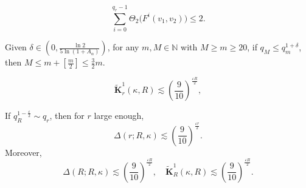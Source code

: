\documentclass[10pt,a4paper]{amsart}
\begin{document}
\begin{equation}\label{r222}
\sum_{i=0}^{q_r-1}\Theta_2\bigl(F^i(v_1,v_2)\bigr)\leq 2.
\end{equation}

\begin{Proposition}\label{arthh}
Given $\delta\in (0,\frac{\ln 2}{5\ln(1+A_\alpha)})$, for any $m,M\in \mathbb{N}$ with $M\geq m\geq 20$, if $q_M\leq q_m^{1+\delta}$, then $M\leq m+[\frac{m}{2}]\leq \frac{3}{2}m$.
\end{Proposition}

\begin{equation}\label{KES}
\widetilde{\mathbf{K}}_r^1(\kappa,R)\lesssim (\frac{9}{10})^{\frac{\varepsilon R}{2}},
\end{equation}

\begin{Lemma}\label{karrr1} If $q_R^{1-\frac{\varepsilon}{2}}\sim q_r$, then for $r$ large enough,
\begin{equation}\label{karrr}
\Delta(r;R,\kappa)\lesssim (\frac{9}{10})^{\frac{\varepsilon r}{2}}.
\end{equation}
Moreover,
\[\Delta(R;R,\kappa)\lesssim (\frac{9}{10})^{\frac{\varepsilon R}{2}},\quad \widetilde{\mathbf{K}}_R^1(\kappa,R)\lesssim (\frac{9}{10})^{\frac{\varepsilon R}{2}}.\]
\end{Lemma}
\end{document}
